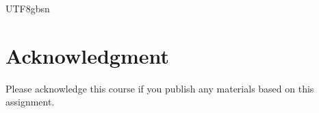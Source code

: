 \documentclass{article}%
\begin{document}
\begin{CJK}{UTF8}{gbsn}









\newpage
\section*{Acknowledgment}

Please acknowledge this course if you publish any materials based on this assignment.

\appendix






\end{CJK}
\end{document}
